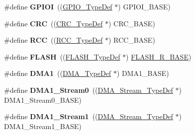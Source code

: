 \begin{DoxyCompactItemize}
\item 
\hypertarget{group___peripheral__declaration_gad15f13545ecdbbabfccf43d5997e5ade}{\#define {\bfseries G\-P\-I\-O\-I}~((\hyperlink{struct_g_p_i_o___type_def}{G\-P\-I\-O\-\_\-\-Type\-Def} $\ast$) G\-P\-I\-O\-I\-\_\-\-B\-A\-S\-E)}\label{group___peripheral__declaration_gad15f13545ecdbbabfccf43d5997e5ade}

\item 
\hypertarget{group___peripheral__declaration_ga4381bb54c2dbc34500521165aa7b89b1}{\#define {\bfseries C\-R\-C}~((\hyperlink{struct_c_r_c___type_def}{C\-R\-C\-\_\-\-Type\-Def} $\ast$) C\-R\-C\-\_\-\-B\-A\-S\-E)}\label{group___peripheral__declaration_ga4381bb54c2dbc34500521165aa7b89b1}

\item 
\hypertarget{group___peripheral__declaration_ga74944438a086975793d26ae48d5882d4}{\#define {\bfseries R\-C\-C}~((\hyperlink{struct_r_c_c___type_def}{R\-C\-C\-\_\-\-Type\-Def} $\ast$) R\-C\-C\-\_\-\-B\-A\-S\-E)}\label{group___peripheral__declaration_ga74944438a086975793d26ae48d5882d4}

\item 
\hypertarget{group___peripheral__declaration_ga844ea28ba1e0a5a0e497f16b61ea306b}{\#define {\bfseries F\-L\-A\-S\-H}~((\hyperlink{struct_f_l_a_s_h___type_def}{F\-L\-A\-S\-H\-\_\-\-Type\-Def} $\ast$) \hyperlink{group___peripheral__memory__map_ga8e21f4845015730c5731763169ec0e9b}{F\-L\-A\-S\-H\-\_\-\-R\-\_\-\-B\-A\-S\-E})}\label{group___peripheral__declaration_ga844ea28ba1e0a5a0e497f16b61ea306b}

\item 
\hypertarget{group___peripheral__declaration_gacc16d2a5937f7585320a98f7f6b578f9}{\#define {\bfseries D\-M\-A1}~((\hyperlink{struct_d_m_a___type_def}{D\-M\-A\-\_\-\-Type\-Def} $\ast$) D\-M\-A1\-\_\-\-B\-A\-S\-E)}\label{group___peripheral__declaration_gacc16d2a5937f7585320a98f7f6b578f9}

\item 
\hypertarget{group___peripheral__declaration_ga61247dd5d594289c404dd8774202dfd8}{\#define {\bfseries D\-M\-A1\-\_\-\-Stream0}~((\hyperlink{struct_d_m_a___stream___type_def}{D\-M\-A\-\_\-\-Stream\-\_\-\-Type\-Def} $\ast$) D\-M\-A1\-\_\-\-Stream0\-\_\-\-B\-A\-S\-E)}\label{group___peripheral__declaration_ga61247dd5d594289c404dd8774202dfd8}

\item 
\hypertarget{group___peripheral__declaration_gaf7d82f110f19982d483eebc465d222b2}{\#define {\bfseries D\-M\-A1\-\_\-\-Stream1}~((\hyperlink{struct_d_m_a___stream___type_def}{D\-M\-A\-\_\-\-Stream\-\_\-\-Type\-Def} $\ast$) D\-M\-A1\-\_\-\-Stream1\-\_\-\-B\-A\-S\-E)}\label{group___peripheral__declaration_gaf7d82f110f19982d483eebc465d222b2}


\end{DoxyCompactItemize}
